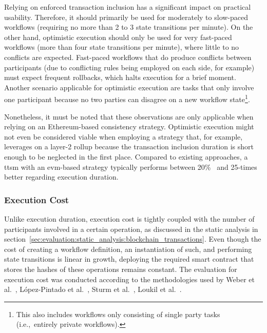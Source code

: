 Relying on enforced transaction inclusion has a significant impact on practical usability. Therefore, it should primarily be used for moderately to slow-paced workflows (requiring no more than 2 to 3 state transitions per minute). On the other hand, optimistic execution should only be used for very fast-paced workflows (more than four state transitions per minute), where little to no conflicts are expected. Fast-paced workflows that do produce conflicts between participants (due to conflicting rules being employed on each side, for example) must expect frequent rollbacks, which halts execution for a brief moment. Another scenario applicable for optimistic execution are tasks that only involve one participant because no two parties can disagree on a new workflow state\footnote{This also includes workflows only consisting of single party tasks (i.e.,\ entirely private workflows).}.

Nonetheless, it must be noted that these observations are only applicable when relying on an Ethereum-based consistency strategy. Optimistic execution might not even be considered viable when employing a strategy that, for example, leverages on a layer-2 rollup because the transaction inclusion duration is short enough to be neglected in the first place. Compared to existing approaches, a \gls{ttsm} with an \gls{evm}-based strategy typically performs between 20\%~\cite{untrusted_bp_execution_using_blockchain} and 25-times~\cite{runtime_verification_for_bp_utilizing_bitcoin} better regarding execution duration.

\subsubsection{Execution Cost}
\label{sec:evaluation:simulations:execution_cost}
Unlike execution duration, execution cost is tightly coupled with the number of participants involved in a certain operation, as discussed in the static analysis in section~\ref{sec:evaluation:static_analysis:blockchain_transactions}. Even though the cost of creating a workflow definition, an instantiation of such, and performing state transitions is linear in growth, deploying the required smart contract that stores the hashes of these operations remains constant. The evaluation for execution cost was conducted according to the methodologies used by Weber et al.~\cite{untrusted_bp_execution_using_blockchain,optimized_execution_of_bp_using_petri_nets_on_blockchain}, López-Pintado et al.~\cite{interpreted_bp_on_blockchain_weber}, Sturm et al.~\cite{lean_architecture_for_blockchain_based_process_execution}, Loukil et al.~\cite{interpreted_bp_on_blockchain_loukil}.

